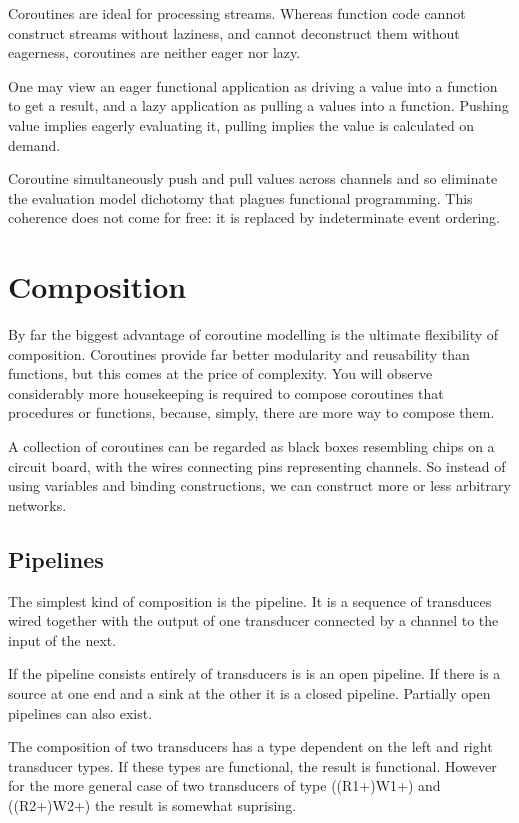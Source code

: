\documentclass{article}
\begin{document}
Coroutines are ideal for processing streams. Whereas
function code cannot construct streams without laziness,
and cannot deconstruct them without eagerness, coroutines
are neither eager nor lazy.

One may view an eager functional application as driving a
value into a function to get a result, and a lazy application
as pulling a values into a function. Pushing value implies
eagerly evaluating it, pulling implies the value is calculated
on demand.

Coroutine simultaneously push and pull values across channels
and so eliminate the evaluation model dichotomy that plagues
functional programming. This coherence does not come for
free: it is replaced by indeterminate event ordering.

\section{Composition}
By far the biggest advantage of coroutine modelling is the 
ultimate flexibility of composition. Coroutines provide
far better modularity and reusability than functions,
but this comes at the price of complexity. You will observe
considerably more housekeeping is required to compose
coroutines that procedures or functions, because, simply,
there are more way to compose them.

A collection of coroutines can be regarded as black boxes
resembling chips on a circuit board, with the wires
connecting pins representing channels. So instead of using
variables and binding constructions, we can construct more
or less arbitrary networks.

\subsection{Pipelines}
The simplest kind of composition is the pipeline. It is a sequence
of transduces wired together with the output of one transducer
connected by a channel to the input of the next.

If the pipeline consists entirely of transducers is is an open
pipeline. If there is a source at one end and a sink at the other
it is a closed pipeline. Partially open pipelines can also exist.

The composition of two transducers has a type dependent on
the left and right transducer types. If these types are functional,
the result is functional. However for the more general case
of two transducers of type ((R1+)W1+) and ((R2+)W2+) the result
is somewhat suprising.
\end{document}
